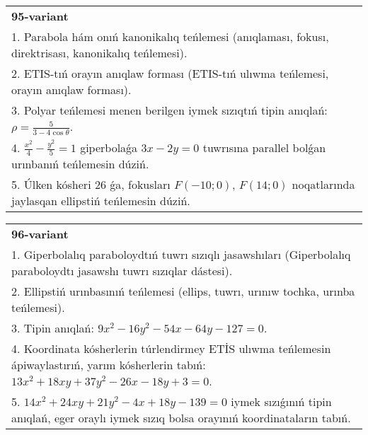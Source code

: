 \documentclass{article}
\begin{document}
\begin{tabular}{m{17cm}}
\textbf{95-variant}\\
1. Parabola hám onıń kanonikalıq teńlemesi (anıqlaması, fokusı, direktrisası, kanonikalıq teńlemesi).\\

2. ETIS-tıń orayın anıqlaw forması (ETIS-tıń ulıwma teńlemesi, orayın anıqlaw forması).\\

3. Polyar teńlemesi menen berilgen iymek sızıqtıń tipin anıqlań: $\rho=\frac{5}{3-4\cos\theta}$.\\

4. $\frac{x^{2}}{4} - \frac{y^{2}}{5} = 1$ giperbolaǵa $3x - 2y = 0$ tuwrısına parallel bolǵan urınbanıń teńlemesin dúziń.  \\

5. Úlken kósheri 26 ǵa, fokusları $F( - 10;0)$, $F(14;0)$ noqatlarında jaylasqan ellipstiń teńlemesin dúziń.  
\end{tabular}
\vspace{1cm}


\begin{tabular}{m{17cm}}
\textbf{96-variant}\\
1. Giperbolalıq paraboloydtıń tuwrı sızıqlı jasawshıları (Giperbolalıq paraboloydtı jasawshı tuwrı sızıqlar dástesi).\\

2. Ellipstiń urınbasınıń teńlemesi (ellips, tuwrı, urınıw tochka, urınba teńlemesi).\\

3. Tipin anıqlań: $9 x^{2}-16 y^{2}-54 x-64 y-127=0$.\\

4. Koordinata kósherlerin túrlendirmey ETİS ulıwma teńlemesin ápiwaylastırıń, yarım kósherlerin tabıń: $13x^{2} + 18xy + 37y^{2} - 26x - 18y + 3 = 0$.  \\

5. $14x^{2} + 24xy + 21y^{2} - 4x + 18y - 139 = 0$ iymek sızıǵınıń tipin anıqlań, eger oraylı iymek sızıq bolsa orayınıń koordinataların tabıń.  
\end{tabular}
\vspace{1cm}
\end{document}
